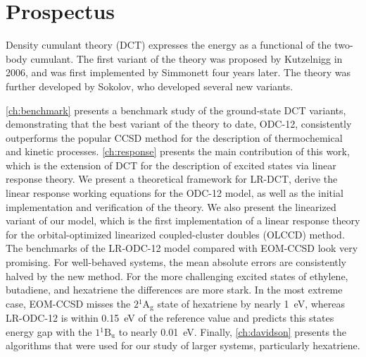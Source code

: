 \section{Prospectus}

Density cumulant theory (DCT) expresses the energy as a functional of the
two-body cumulant.
The first variant of the theory was proposed by Kutzelnigg in
2006,\cite{Kutzelnigg:2006p171101} and was first implemented by Simmonett four
years later.\cite{Simmonett:2010p174122}
The theory was further developed by Sokolov, who developed several new
variants.\cite{Sokolov:2013p024107,Sokolov:2013p204110,Sokolov:2014p074111}

\cref{ch:benchmark} presents a benchmark study of the ground-state DCT variants,
demonstrating that the best variant of the theory to date, ODC-12, consistently
outperforms the popular CCSD method for the description of thermochemical and
kinetic processes.
\cref{ch:response} presents the main contribution of this work, which is the
extension of DCT for the description of excited states via linear response
theory.
We present a theoretical framework for LR-DCT, derive the linear response
working equations for the ODC-12 model, as well as the initial implementation
and verification of the theory.
We also present the linearized variant of our model, which is the first
implementation of a linear response theory for the orbital-optimized linearized
coupled-cluster doubles (OLCCD) method.
The benchmarks of the LR-ODC-12 model compared with EOM-CCSD look very
promising.
For well-behaved systems, the mean absolute errors are consistently halved by
the new method.
For the more challenging excited states of ethylene, butadiene, and hexatriene
the differences are more stark.
In the most extreme case, EOM-CCSD misses the \(2{}^1\mathrm{A_g}\) state of
hexatriene by nearly 1~eV, whereas LR-ODC-12 is within 0.15~eV of the reference
value and predicts this states energy gap with the \(1{}^1\mathrm{B_u}\) to
nearly 0.01~eV.
Finally, \cref{ch:davidson} presents the algorithms that were used for our study
of larger systems, particularly hexatriene.
